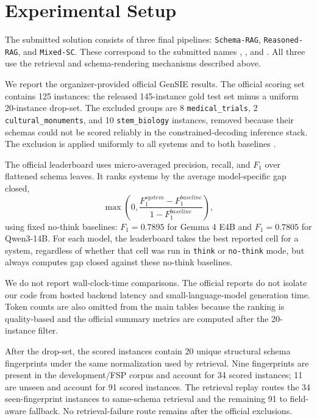 \section{Experimental Setup}

The submitted solution consists of three final pipelines: \texttt{Schema-RAG}, \texttt{Reasoned-RAG}, and \texttt{Mixed-SC}. These correspond to the submitted names , , and . All three use the retrieval and schema-rendering mechanisms described above.

We report the organizer-provided official GenSIE results. The official scoring set contains 125 instances: the released 145-instance gold test set minus a uniform 20-instance drop-set. The excluded groups are 8 \texttt{medical\_trials}, 2 \texttt{cultural\_monuments}, and 10 \texttt{stem\_biology} instances, removed because their schemas could not be scored reliably in the constrained-decoding inference stack. The exclusion is applied uniformly to all systems and to both baselines \cite{gensie2026overview}.

The official leaderboard uses micro-averaged precision, recall, and \(F_1\) over flattened schema leaves. It ranks systems by the average model-specific gap closed,
\[
  \max\left(0, \frac{F_1^{system} - F_1^{baseline}}{1 - F_1^{baseline}}\right),
\]
using fixed no-think baselines: \(F_1=0.7895\) for Gemma 4 E4B and \(F_1=0.7805\) for Qwen3-14B. For each model, the leaderboard takes the best reported cell for a system, regardless of whether that cell was run in \texttt{think} or \texttt{no-think} mode, but always computes gap closed against these no-think baselines.

We do not report wall-clock-time comparisons. The official reports do not isolate our code from hosted backend latency and small-language-model generation time. Token counts are also omitted from the main tables because the ranking is quality-based and the official summary metrics are computed after the 20-instance filter.

After the drop-set, the scored instances contain 20 unique structural schema fingerprints under the same normalization used by retrieval. Nine fingerprints are present in the development/FSP corpus and account for 34 scored instances; 11 are unseen and account for 91 scored instances. The retrieval replay routes the 34 seen-fingerprint instances to same-schema retrieval and the remaining 91 to field-aware fallback. No retrieval-failure route remains after the official exclusions.

